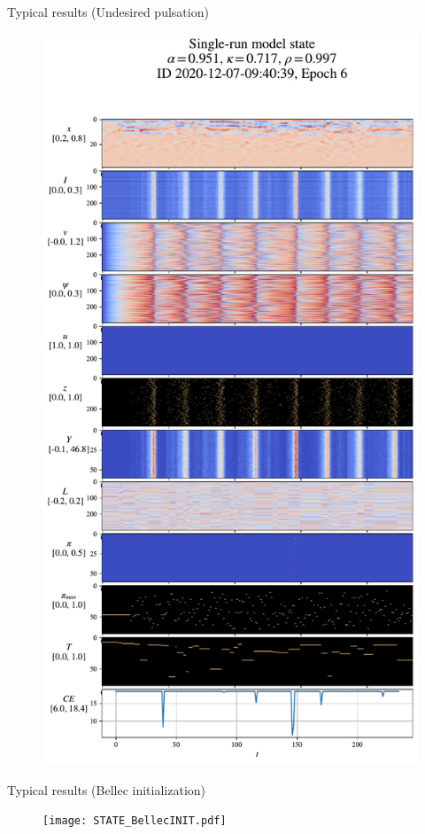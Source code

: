 \documentclass[t]{beamer}
\begin{document}
\begin{frame}{Typical results (Undesired pulsation)}

	\begin{figure}[!ht]
		\includegraphics[clip, trim=0cm 0cm 0cm 4.2cm, width=0.33\linewidth]{STATE_pulsating.pdf}  %
	\end{figure}

\end{frame}

\begin{frame}{Typical results (Bellec initialization)}

	\begin{figure}[!ht]
		\texttt{[image: STATE\_BellecINIT.pdf]}  %
	\end{figure}

\end{frame}
\end{document}
